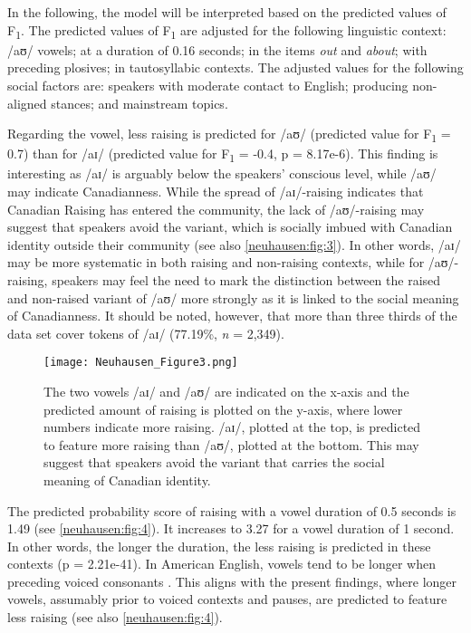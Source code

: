 \documentclass[output=paper]{langscibook}
\begin{document}
 In the following, the model will be interpreted based on the predicted values of F\textsubscript{1}. The predicted values of F\textsubscript{1} are adjusted for the following linguistic context: /aʊ/ vowels; at a duration of 0.16 seconds; in the items \textit{out} and \textit{about}; with preceding plosives; in tautosyllabic contexts. The adjusted values for the following social factors are: speakers with moderate contact to English; producing non-aligned stances; and mainstream topics. 



\largerpage
Regarding the vowel, less raising is predicted for /aʊ/ (predicted value for F\textsubscript{1} = 0.7) than for /aɪ/ (predicted value for F\textsubscript{1} = -0.4, p = 8.17e-6). This finding is interesting as /aɪ/ is arguably below the speakers’ conscious level, while /aʊ/ may indicate Canadianness. While the spread of /aɪ/-raising indicates that Canadian Raising has entered the community, the lack of /aʊ/-raising may suggest that speakers avoid the variant, which is socially imbued with Canadian identity outside their community (see also \autoref{neuhausen:fig:3}). In other words, /aɪ/ may be more systematic in both raising and non-raising contexts, while for /aʊ/-raising, speakers may feel the need to mark the distinction between the raised and non-raised variant of /aʊ/ more strongly as it is linked to the social meaning of Canadianness. It should be noted, however, that more than three thirds of the data set cover tokens of /aɪ/ (77.19\%, \textit{n} = 2,349).


\begin{figure}
    \texttt{[image: Neuhausen\_Figure3.png]}
    \caption{The two vowels /aɪ/ and /aʊ/ are indicated on the x-axis and the predicted amount of raising is plotted on the y-axis, where lower numbers indicate more raising. /aɪ/, plotted at the top, is predicted to feature more raising than /aʊ/, plotted at the bottom. This may suggest that speakers avoid the variant that carries the social meaning of Canadian identity.}
    \label{neuhausen:fig:3}
\end{figure}


The predicted probability score of raising with a vowel duration of 0.5 seconds is 1.49 (see \autoref{neuhausen:fig:4}). It increases to 3.27 for a vowel duration of 1 second. In other words, the longer the duration, the less raising is predicted in these contexts (p = 2.21e-41). In American English, vowels tend to be longer when preceding voiced consonants \citep[119]{kendall_sociophonetics_2021}. This aligns with the present findings, where longer vowels, assumably prior to voiced contexts and pauses, are predicted to feature less raising (see also \autoref{neuhausen:fig:4}).
\end{document}

